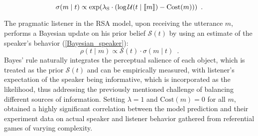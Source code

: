 \begin{equation} \label{Bayesian_speaker}
\sigma(m \mid t) \propto \exp(\lambda_\mathrm{S} \cdot (\log \mathcal{U}(t\mid \llbracket m \rrbracket)-\mbox{Cost}(m))) \enspace .
\end{equation}

The pragmatic listener in the RSA model, upon receiving the utterance
$m$, performs a Bayesian update on his prior belief $\mathcal{S}(t)$
by using an estimate of the speaker's behavior
(\ref{Bayesian_speaker}):
\begin{equation} \label{Bayesian_rec_update}
\rho(t \mid m) \propto \mathcal{S}(t)\cdot \sigma(m \mid t) \enspace .  
\end{equation}
Bayes' rule naturally integrates the perceptual salience of each
object, which is treated as the prior $\mathcal{S}(t)$ and can be
empirically measured, with listener's expectation of the speaker being
informative, which is incorporated as the likelihood, thus addressing
the previously mentioned challenge of balancing different sources of
information. Setting $\lambda=1$ and $\mbox{Cost}(m)=0$ for all $m$,
\cite{Frank} obtained a highly significant correlation between the
model prediction and their experiment data on actual speaker and
listener behavior gathered from referential games of varying
complexity.



